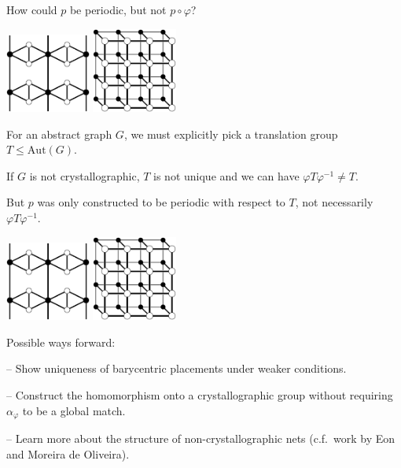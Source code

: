 \documentclass{beamer}
\begin{document}
\begin{frame}
  \begin{center}
    How could $p$ be periodic, but not $p\circ\varphi$?

    \includegraphics[width=1.1in]{unstable}
    \quad
    \includegraphics[width=1.1in]{ladder}

    For an abstract graph $G$, we must explicitly pick a translation group
    $T\leq \mathrm{Aut}(G)$.

    If $G$ is not crystallographic, $T$ is not unique and we can have $\varphi
    T\varphi^{-1} \neq T$.

    But $p$ was only constructed to be periodic with respect to $T$, not
    necessarily $\varphi T\varphi^{-1}$.
  \end{center}
\end{frame}

\begin{frame}
  \begin{center}
    \includegraphics[width=1.1in]{unstable}
    \quad
    \includegraphics[width=1.1in]{ladder}

    Possible ways forward:

    -- Show uniqueness of barycentric placements under weaker conditions.

    -- Construct the homomorphism onto a crystallographic group without
    requiring $\alpha_\varphi$ to be a global match.

    -- Learn more about the structure of non-crystallographic nets (c.f.\ work
    by Eon and Moreira de Oliveira).
  \end{center}
\end{frame}
\end{document}
